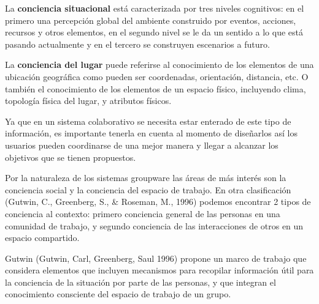 La \textbf{conciencia situacional} est\'a caracterizada por tres niveles cognitivos: en el primero una percepci\'on global del ambiente construido por eventos, acciones, recursos y otros elementos, en el segundo nivel se le da un sentido a lo que est\'a pasando actualmente y en el tercero se construyen escenarios a futuro.

La \textbf{conciencia del lugar} puede referirse al conocimiento de los elementos de una ubicaci\'on geogr\'afica como pueden ser coordenadas, orientaci\'on, distancia, etc. O tambi\'en el conocimiento de los elementos de un espacio f\'isico, incluyendo clima, topolog\'ia f\'isica del lugar, y atributos f\'isicos.

Ya que en un sistema colaborativo se necesita estar enterado de este tipo de informaci\'on, es importante tenerla en cuenta al momento de dise\~narlos as\'i los usuarios pueden coordinarse de una mejor manera y llegar a alcanzar los objetivos que se tienen propuestos.

Por la naturaleza de los sistemas groupware las \'areas de m\'as inter\'es son la conciencia social y la conciencia del espacio de trabajo. En otra clasificaci\'on (Gutwin, C., Greenberg, S., \& Roseman, M., 1996) podemos encontrar 2 tipos de conciencia al contexto: primero conciencia general de las personas en una comunidad de trabajo, y segundo conciencia de las interacciones de otros en un espacio compartido.

Gutwin (Gutwin, Carl, Greenberg, Saul 1996) propone un marco de trabajo que considera elementos que incluyen mecanismos para recopilar informaci\'on \'util para la conciencia de la situaci\'on por parte de las personas, y que integran el conocimiento consciente del espacio de trabajo de un grupo.

